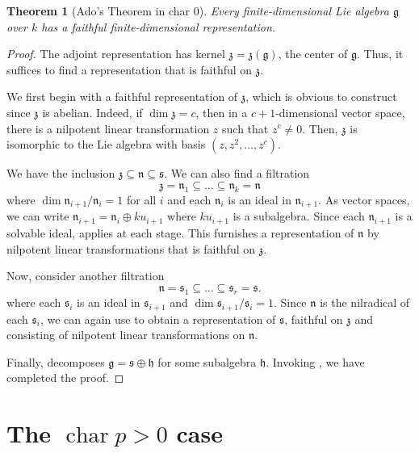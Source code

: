 \documentclass[12pt]{article}
\theoremstyle{thmstyle}
\newtheorem{theorem}{Theorem}[section]
\theoremstyle{defstyle}
\newcommand{\chr}{\operatorname{char}}
\newcommand{\frakg}{\mathfrak{g}}
\newcommand{\frakh}{\mathfrak{h}}
\newcommand{\frakn}{\mathfrak{n}} %
\newcommand{\fraks}{\mathfrak{s}}
\newcommand{\frakz}{\mathfrak{z}}
\begin{document}
\begin{theorem}[Ado's Theorem in char $0$]
    Every finite-dimensional Lie algebra $\frakg$ over $k$ has a faithful finite-dimensional representation.
\end{theorem}
\begin{proof}
     The adjoint representation has kernel $\frakz = \frakz(\frakg)$, the center of $\frakg$. Thus, it suffices to find a representation that is faithful on $\frakz$. 
     
     We first begin with a faithful representation of $\frakz$, which is obvious to construct since $\frakz$ is abelian. Indeed, if $\dim\frakz = c$, then in a $c + 1$-dimensional vector space, there is a nilpotent linear transformation $z$ such that $z^c \ne 0$. Then, $\frakz$ is isomorphic to the Lie algebra with basis $(z, z^2,\dots, z^c)$.
     
     We have the inclusion $\frakz\subseteq\frakn\subseteq\fraks$. We can also find a filtration 
     \begin{equation*}
         \frakz = \frakn_1\subseteq\dots\subseteq\frakn_k = \frakn
     \end{equation*}
     where $\dim\frakn_{i + 1}/\frakn_i = 1$ for all $i$ and each $\frakn_i$ is an ideal in $\frakn_{i + 1}$. As vector spaces, we can write $\frakn_{i + 1} = \frakn_i\oplus ku_{i + 1}$ where $ku_{i + 1}$ is a subalgebra. Since each $\frakn_{i + 1}$ is a solvable ideal,  applies at each stage. This furnishes a representation of $\frakn$ by nilpotent linear transformations that is faithful on $\frakz$.

     Now, consider another filtration 
     \begin{equation*}
         \frakn = \fraks_1\subseteq\dots\subseteq\fraks_r = \fraks.
     \end{equation*}
     where each $\fraks_i$ is an ideal in $\fraks_{i + 1}$ and $\dim\fraks_{i + 1}/\fraks_i = 1$. Since $\frakn$ is the nilradical of each $\fraks_i$, we can again use  to obtain a representation of $\fraks$, faithful on $\frakz$ and consisting of nilpotent linear transformations on $\frakn$.

     Finally,  decomposes $\frakg = \fraks\oplus\frakh$ for some subalgebra $\frakh$. Invoking , we have completed the proof.
\end{proof}

\section{The \texorpdfstring{$\chr p > 0$}{char p > 0} case}
\end{document}
